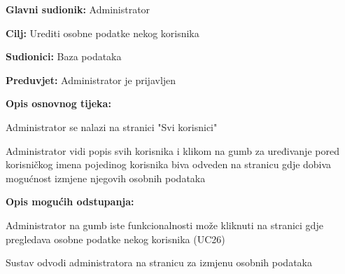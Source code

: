 					\noindent {}
					\begin{packed_item}
	
						\item \textbf{Glavni sudionik: }Administrator
						\item  \textbf{Cilj:} Urediti osobne podatke nekog korisnika
						\item  \textbf{Sudionici:} Baza podataka
						\item  \textbf{Preduvjet:} Administrator je prijavljen
						\item  \textbf{Opis osnovnog tijeka:}
						
						\item[] \begin{packed_enum}
	
							\item Administrator se nalazi na stranici "Svi korisnici"
							\item Administrator vidi popis svih korisnika i klikom na gumb za uređivanje pored korisničkog imena pojedinog korisnika biva odveden na stranicu gdje dobiva mogućnost izmjene njegovih osobnih podataka
							
						\end{packed_enum}
						
						\item  \textbf{Opis mogućih odstupanja:}
						\item[] \begin{packed_item}
	
							\item[2.a] Administrator na gumb iste funkcionalnosti može kliknuti na stranici gdje pregledava osobne podatke nekog korisnika (UC26)
							\item[] \begin{packed_enum}
								
								\item Sustav odvodi administratora na stranicu za izmjenu osobnih podataka
								
							\end{packed_enum}
						\end{packed_item}
					\end{packed_item}
					
